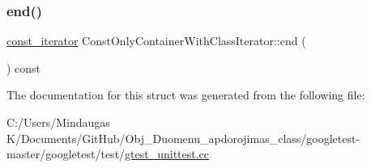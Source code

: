 \mbox{\label{struct_const_only_container_with_class_iterator_a3d6e17f17eecd7b1ef02afc9a75a0bde}} 
\subsubsection{\texorpdfstring{end()}{end()}\hspace{0.1cm}{\footnotesize\ttfamily [2/2]}}
{\footnotesize\ttfamily \mbox{\hyperlink{struct_const_only_container_with_class_iterator_1_1const__iterator}{const\+\_\+iterator}} Const\+Only\+Container\+With\+Class\+Iterator\+::end (\begin{DoxyParamCaption}{ }\end{DoxyParamCaption}) const}



The documentation for this struct was generated from the following file\+:\begin{DoxyCompactItemize}
\item 
C\+:/\+Users/\+Mindaugas K/\+Documents/\+Git\+Hub/\+Obj\+\_\+\+Duomenu\+\_\+apdorojimas\+\_\+class/googletest-\/master/googletest/test/\mbox{\hyperlink{googletest-master_2googletest_2test_2gtest__unittest_8cc}{gtest\+\_\+unittest.\+cc}}\end{DoxyCompactItemize}
